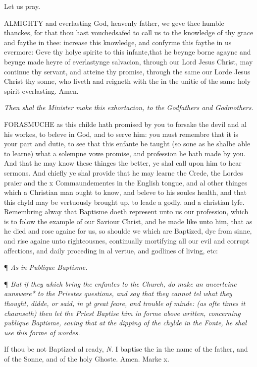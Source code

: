 Let
us pray.

ALMIGHTY
and everlasting God, heavenly father, we geve thee humble thanckes, for
that thou hast vouchedsafed to call us to the knowledge of thy grace and
faythe in thee: increase this knowledge, and confyrme this faythe in us
evermore: Geve thy holye spirite to this infante,that he beynge borne
agayne and beynge made heyre of everlastynge salvacion, through our Lord
Jesus Christ, may continue thy servant, and atteine thy promise, through
the same our Lorde Jesus Christ thy sonne, who liveth and reigneth with
the in the unitie of the same holy spirit everlasting. Amen.

\emph{Then
shal the Minister make this exhortacion, to the Godfathers and Godmothers.}

FORASMUCHE
as this childe hath promised by you to forsake the devil and al his workes,
to beleve in God, and to serve him: you must remembre that it is your
part and dutie, to see that this enfante be taught (so sone as he shalbe
able to learne) what a solempne vowe promise, and profession he hath made
by you. And that he may know these thinges the better, ye shal call upon
him to hear sermons. And chiefly ye shal provide that he may learne the
Crede, the Lordes praier and the x Commaundementes in the English tongue,
and al other thinges which a Christian man ought to know, and beleve to
his soules health, and that this chyld may be vertuously brought up, to
leade a godly, and a christian lyfe. Remembring alway that Baptisme doeth
represent unto us our profession, which is to folow the example of our
Saviour Christ, and be made like unto him, that as he died and rose againe
for us, so shoulde we which are Baptized, dye from sinne, and rise againe
unto righteousnes, continually mortifying all our evil and corrupt affections,
and daily proceding in al vertue, and godlines of living, etc:

¶
\emph{As in Publique Baptisme.}

¶ \emph{But
if they which bring the enfantes to the Church, do make an uncerteine
aunswere* to the Priestes questions, and say that they cannot tel what
they thought, didde, or said, in yt great feare, and trouble
of minde: (as ofte times it chaunseth) then let the Priest Baptise him
in forme above written, concerning publique Baptisme, saving that at the
dipping of the chylde in the Fonte, he shal use this forme af wordes.}

If thou be not Baptized al ready, \emph{N}. I baptise the in the name
of the father, and of the Sonne, and of the holy Ghoste. Amen. Marke
x.

